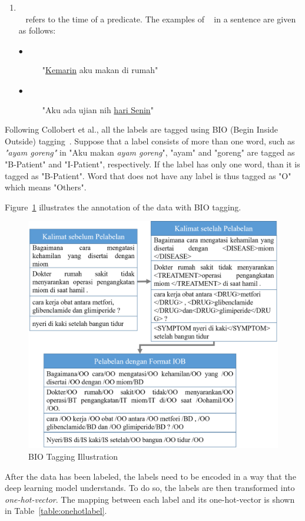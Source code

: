 \begin{enumerate}
	\item \timesrl\\
	\timesrl~ refers to the time of a predicate. The examples of \timesrl~ in a sentence are given as follows:
	\begin{description}
		\item[$\bullet$] "\underline{Kemarin} aku makan di rumah"
		\item[$\bullet$] "Aku ada ujian nih \underline{hari Senin}"
	\end{description}
\end{enumerate}

Following Collobert et al., all the labels are tagged using BIO (Begin Inside Outside) tagging~\cite{collobert2011natural}. Suppose that a label \patient consists of more than one word, such as \textit{"ayam goreng"} in "Aku makan \textit{ayam goreng}", "ayam" and "goreng" are tagged as "B-Patient" and "I-Patient", respectively. If the label has only one word, than it is tagged as "B-Patient". Word that does not have any label is thus tagged as "O" which means "Others".

Figure~\ref{fig:BIO} illustrates the annotation of the data with BIO tagging.

\begin{figure}
	\centering
	\includegraphics[width=0.85\linewidth]{images/pelabelan}
	\caption{BIO Tagging Illustration}
	\label{fig:BIO}
\end{figure}

After the data has been labeled, the labels need to be encoded in a way that the deep learning model understands. To do so, the labels are then transformed into \textit{one-hot-vector}. The mapping between each label and its one-hot-vector is shown in Table~\ref{table:onehotlabel}.

